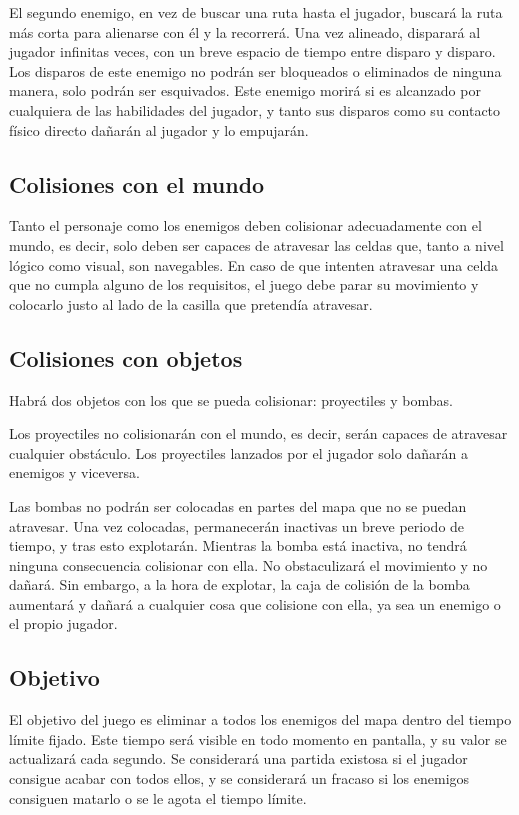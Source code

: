 		El segundo enemigo, en vez de buscar una ruta hasta el jugador, buscará la ruta más corta para alienarse con él y la recorrerá. Una vez alineado, disparará al jugador infinitas veces, con un breve espacio de tiempo entre disparo y disparo. Los disparos de este enemigo no podrán ser bloqueados o eliminados de ninguna manera, solo podrán ser esquivados. Este enemigo morirá si es alcanzado por cualquiera de las habilidades del jugador, y tanto sus disparos como su contacto físico directo dañarán al jugador y lo empujarán.

	\subsection{Colisiones con el mundo}

		Tanto el personaje como los enemigos deben colisionar adecuadamente con el mundo, es decir, solo deben ser capaces de atravesar las celdas que, tanto a nivel lógico como visual, son navegables. En caso de que intenten atravesar una celda que no cumpla alguno de los requisitos, el juego debe parar su movimiento y colocarlo justo al lado de la casilla que pretendía atravesar.

	\subsection{Colisiones con objetos}

		Habrá dos objetos con los que se pueda colisionar: proyectiles y bombas.

		Los proyectiles no colisionarán con el mundo, es decir, serán capaces de atravesar cualquier obstáculo. Los proyectiles lanzados por el jugador solo dañarán a enemigos y viceversa.

		Las bombas no podrán ser colocadas en partes del mapa que no se puedan atravesar. Una vez colocadas, permanecerán inactivas un breve periodo de tiempo, y tras esto explotarán. Mientras la bomba está inactiva, no tendrá ninguna consecuencia colisionar con ella. No obstaculizará el movimiento y no dañará. Sin embargo, a la hora de explotar, la caja de colisión de la bomba aumentará y dañará a cualquier cosa que colisione con ella, ya sea un enemigo o el propio jugador.

	\subsection{Objetivo}

		El objetivo del juego es eliminar a todos los enemigos del mapa dentro del tiempo límite fijado. Este tiempo será visible en todo momento en pantalla, y su valor se actualizará cada segundo. Se considerará una partida existosa si el jugador consigue acabar con todos ellos, y se considerará un fracaso si los enemigos consiguen matarlo o se le agota el tiempo límite.

